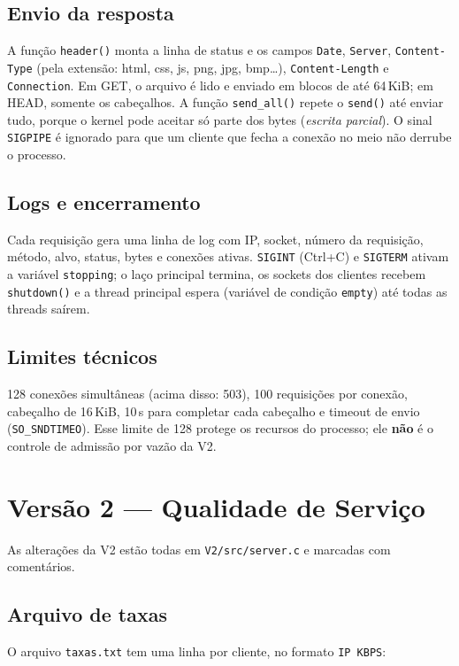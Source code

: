 \documentclass[11pt,a4paper]{article}
\begin{document}
\subsection{Envio da resposta}
A função \texttt{header()} monta a linha de status e os campos \texttt{Date},
\texttt{Server}, \texttt{Content-Type} (pela extensão: html, css, js, png, jpg, bmp\ldots),
\texttt{Content-Length} e \texttt{Connection}. Em GET, o arquivo é lido e enviado em blocos
de até 64\,KiB; em HEAD, somente os cabeçalhos. A função \texttt{send\_all()} repete o
\texttt{send()} até enviar tudo, porque o kernel pode aceitar só parte dos bytes
(\emph{escrita parcial}). O sinal \texttt{SIGPIPE} é ignorado para que um cliente que
fecha a conexão no meio não derrube o processo.

\subsection{Logs e encerramento}
Cada requisição gera uma linha de log com IP, socket, número da requisição, método, alvo,
status, bytes e conexões ativas. \texttt{SIGINT} (Ctrl+C) e \texttt{SIGTERM} ativam a
variável \texttt{stopping}; o laço principal termina, os sockets dos clientes recebem
\texttt{shutdown()} e a thread principal espera (variável de condição \texttt{empty})
até todas as threads saírem.

\subsection{Limites técnicos}
128 conexões simultâneas (acima disso: 503), 100 requisições por conexão, cabeçalho de
16\,KiB, 10\,s para completar cada cabeçalho e timeout de envio (\texttt{SO\_SNDTIMEO}).
Esse limite de 128 protege os recursos do processo; ele \textbf{não} é o controle de
admissão por vazão da V2.

\section{Versão 2 --- Qualidade de Serviço}

As alterações da V2 estão todas em \texttt{V2/src/server.c} e marcadas com comentários.

\subsection{Arquivo de taxas}
O arquivo \texttt{taxas.txt} tem uma linha por cliente, no formato \texttt{IP KBPS}:
\end{document}

